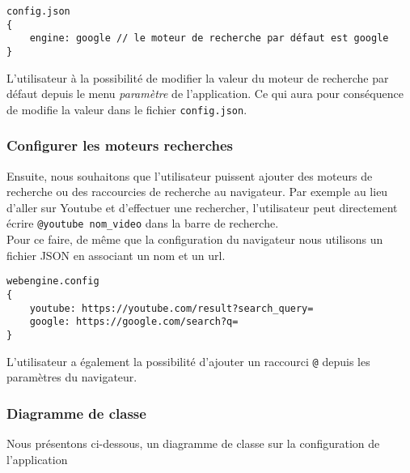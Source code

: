 \documentclass[10pt,a4paper]{article}
\begin{document}
\begin{verbatim}
config.json
{
    engine: google // le moteur de recherche par défaut est google
}
\end{verbatim}

L'utilisateur à la possibilité de modifier la valeur du moteur de recherche par défaut depuis le menu \textit{paramètre} de l'application. Ce qui aura pour conséquence de modifie la valeur dans le fichier \verb|config.json|.

\subsubsection{Configurer les moteurs recherches}
Ensuite, nous souhaitons que l'utilisateur puissent ajouter des moteurs de recherche ou des raccourcies de recherche au navigateur. Par exemple au lieu d'aller sur Youtube et d'effectuer une rechercher, l'utilisateur peut directement écrire \verb|@youtube nom_video| dans la barre de recherche. \\
Pour ce faire, de même que la configuration du navigateur nous utilisons un fichier JSON en associant un nom et un url.
\begin{verbatim}
webengine.config
{
    youtube: https://youtube.com/result?search_query=
    google: https://google.com/search?q=
}
\end{verbatim}

L'utilisateur a également la possibilité d'ajouter un raccourci \verb|@| depuis les paramètres du navigateur.


\subsubsection{Diagramme de classe}
Nous présentons ci-dessous, un diagramme de classe sur la configuration de l'application
\end{document}

